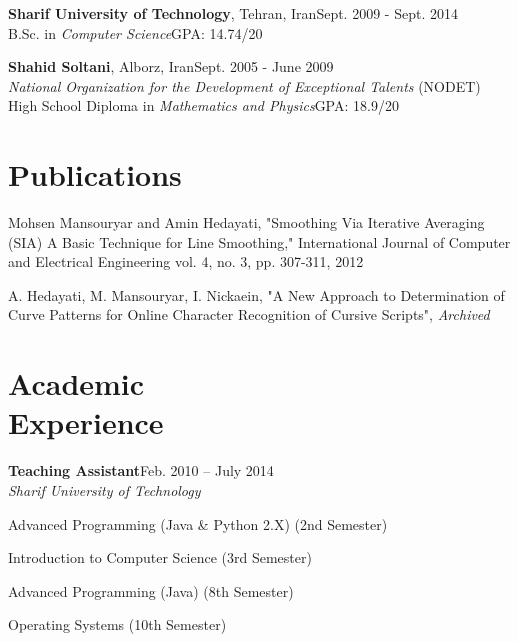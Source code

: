 \documentclass[margin,line]{resume}
\begin{document}
\begin{resume}
    {\bf Sharif University  of Technology}, Tehran, Iran\hfill {\sf Sept. 2009 - Sept. 2014}\vspace{1mm}\\
	B.Sc. in {\sl Computer Science}\hfill {\sf GPA: 14.74/20}
    
    {\bf Shahid Soltani}, Alborz, Iran\hfill {\sf Sept. 2005 - June 2009}\vspace{1mm}\\
    {\sl National Organization for the Development of Exceptional Talents} (NODET) \vspace{1mm}\\
    High School Diploma in {\sl Mathematics and Physics}\hfill {\sf GPA: 18.9/20}

    \section{\mysidestyle Publications}

    Mohsen Mansouryar and Amin Hedayati, "Smoothing Via Iterative Averaging (SIA) A Basic Technique for Line Smoothing," International Journal of Computer and Electrical Engineering vol. 4, no. 3, pp. 307-311, 2012

	A. Hedayati, M. Mansouryar, I. Nickaein, "A New Approach to Determination of Curve Patterns for Online Character
Recognition of Cursive Scripts", ‎\textit{Archived}‎
    \section{\mysidestyle Academic\\Experience}

    {\bf Teaching Assistant}\vspace{1mm}\hfill {\sf Feb. 2010 -- July 2014}\\
    {\sl Sharif University of Technology}
    \begin{list2}
        \item Advanced Programming (Java \& Python 2.X) (2nd Semester)
        \item Introduction to Computer Science (3rd Semester)
        \item Advanced Programming (Java) (8th Semester)
        \item Operating Systems (10th Semester)
    \end{list2}
    

\end{resume}
\end{document}

